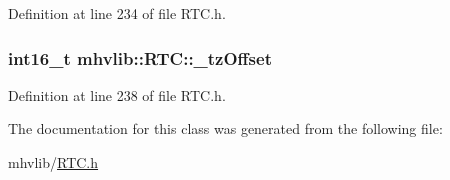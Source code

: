 Definition at line 234 of file R\-T\-C.\-h.

\hypertarget{classmhvlib_1_1_r_t_c_a27f82fc89f040744c940bbe98d57f1b1}{
\subsubsection[{\-\_\-tz\-Offset}]{\setlength{\rightskip}{0pt plus 5cm}int16\-\_\-t mhvlib\-::\-R\-T\-C\-::\-\_\-tz\-Offset\hspace{0.3cm}{\ttfamily [protected]}}}\label{classmhvlib_1_1_r_t_c_a27f82fc89f040744c940bbe98d57f1b1}


Definition at line 238 of file R\-T\-C.\-h.



The documentation for this class was generated from the following file\-:\begin{DoxyCompactItemize}
\item 
mhvlib/\hyperlink{_r_t_c_8h}{R\-T\-C.\-h}\end{DoxyCompactItemize}
